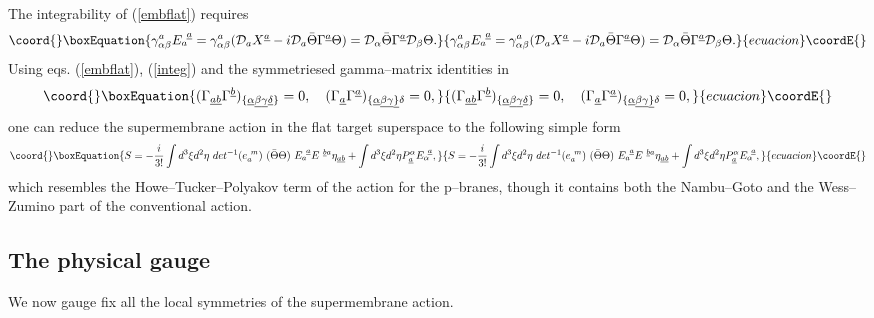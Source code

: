 \documentclass[a4paper,12pt]{article}
\begin{document}
The integrability of (\ref{embflat}) requires
\begin{equation}\coord{}\boxEquation{\label{integ}
\gamma^a_{\alpha\beta}{E}^{~\underline a}_a
=\gamma^a_{\alpha\beta}({\cal D}_a X^{\underline a} -i{\cal
D}_a\bar\Theta\Gamma^{\underline a}\Theta)={\cal
D}_\alpha\bar\Theta\Gamma^{\underline a}{\cal D}_\beta\Theta.
}{\gamma^a_{\alpha\beta}{E}^{~\underline a}_a
=\gamma^a_{\alpha\beta}({\cal D}_a X^{\underline a} -i{\cal
D}_a\bar\Theta\Gamma^{\underline a}\Theta)={\cal
D}_\alpha\bar\Theta\Gamma^{\underline a}{\cal D}_\beta\Theta.
}{ecuacion}\coordE{}\end{equation}
Using eqs. (\ref{embflat}), (\ref{integ}) and the symmetriesed
gamma--matrix identities in \coordHE{}
\begin{equation}\coord{}\boxEquation{\label{gammai}
(\Gamma_{\underline{ab}}\Gamma^{\underline
b})_{\{\underline\alpha\underline\beta\underline\gamma\underline\delta\}}=0,
\quad
(\Gamma_{\underline{a}}\Gamma^{\underline
a})_{\{\underline\alpha\underline\beta\underline\gamma\underline\}\delta}=0,
}{(\Gamma_{\underline{ab}}\Gamma^{\underline
b})_{\{\underline\alpha\underline\beta\underline\gamma\underline\delta\}}=0,
\quad
(\Gamma_{\underline{a}}\Gamma^{\underline
a})_{\{\underline\alpha\underline\beta\underline\gamma\underline\}\delta}=0,
}{ecuacion}\coordE{}\end{equation}
one can reduce the supermembrane action in the flat target
superspace to the following simple form
\begin{equation}\coord{}\boxEquation{\label{a2d4p}
S=-{i\over{3!}}\int d^3\xi
d^2\eta~det^{-1}(e^{~m}_a)~(\bar\Theta\Theta)~{ E}^{~\underline
a}_a{E}^{~\underline b a}\eta_{\underline a\underline b}+\int
d^3\xi d^2\eta P^\alpha_{\underline a}{E}^{~\underline
a}_{\alpha},
}{S=-{i\over{3!}}\int d^3\xi
d^2\eta~det^{-1}(e^{~m}_a)~(\bar\Theta\Theta)~{ E}^{~\underline
a}_a{E}^{~\underline b a}\eta_{\underline a\underline b}+\int
d^3\xi d^2\eta P^\alpha_{\underline a}{E}^{~\underline
a}_{\alpha},
}{ecuacion}\coordE{}\end{equation}
which resembles the Howe--Tucker--Polyakov term of the action for
the p--branes, though it contains both the Nambu--Goto and the
Wess--Zumino part of the conventional action.

\subsection{The physical gauge}
We now gauge fix all the local symmetries of the supermembrane
action.
\end{document}
